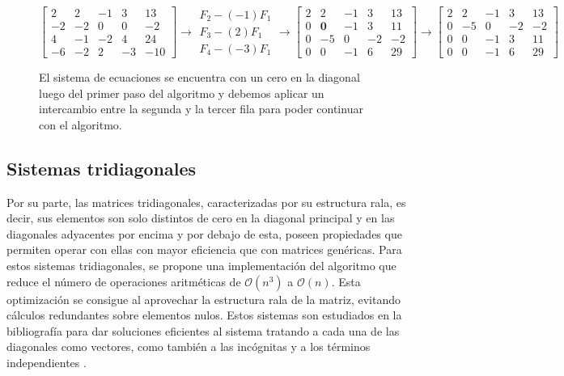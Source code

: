 \begin{figure}[H]
    $$
    \left[\begin{array}{cccc|c}
    2 & 2 & -1 & 3 & 13 \\
    -2 & -2 & 0 & 0 & -2 \\
    4 & -1 & -2 & 4 & 24 \\
    -6 & -2 & 2 & -3 & -10
    \end{array}\right] \rightarrow \begin{gathered}
    F_2-(-1) F_1 \\
    F_3-(2) F_1 \\
    F_4-(-3) F_1
    \end{gathered} \longrightarrow\left[\begin{array}{cccc|c}
    2 & 2 & -1 & 3 & 13 \\
    0 & \textbf{0} & -1 & 3 & 11 \\
    0 & -5 & 0 & -2 & -2 \\
    0 & 0 & -1 & 6 & 29
    \end{array}\right]\longrightarrow\left[\begin{array}{cccc|c}
    2 & 2 & -1 & 3 & 13 \\
    0 & -5 & 0 & -2 & -2 \\
    0 & 0 & -1 & 3 & 11 \\
    0 & 0 & -1 & 6 & 29
    \end{array}\right]
    $$
    
    \caption{El sistema de ecuaciones se encuentra con un cero en la diagonal luego del primer paso del algoritmo y debemos aplicar un intercambio entre la segunda y la tercer fila para poder continuar con el algoritmo.}
    \label{fig:pivoting}

\end{figure}

\subsection{Sistemas tridiagonales}

Por su parte, las matrices tridiagonales, caracterizadas por su estructura rala, es decir, sus elementos son solo distintos de cero en la diagonal principal y en las diagonales adyacentes por encima y por debajo de esta, poseen propiedades que permiten operar con ellas con mayor eficiencia que con matrices genéricas. Para estos sistemas tridiagonales, se propone una implementación del algoritmo que reduce el número de operaciones aritméticas de $\mathcal{O}(n^3)$ a $\mathcal{O}(n)$. Esta optimización se consigue al aprovechar la estructura rala de la matriz, evitando cálculos redundantes sobre elementos nulos. Estos sistemas son estudiados en la bibliografía para dar soluciones eficientes al sistema tratando a cada una de las diagonales como vectores, como también a las incógnitas y a los términos independientes \cite{Recipes07}. 

